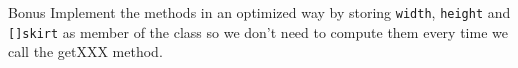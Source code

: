\documentclass[letterpaper,12pt]{article}
\begin{document}
 \begin{bclogo}[logo=\bcattention, noborder=true]{Bonus}
Implement the methods in an optimized way by storing \verb|width|, \verb|height| and \verb|[]skirt| as member of the class so we don't
    need to compute them every time we call the getXXX method.
    
 \end{bclogo}
 
\end{document}
